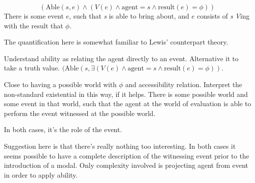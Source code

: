 \begin{note}
  \[(\text{Able}(s,e) \land (V(e) \land \text{agent} = s \land \text{result}(e) = \phi))\]
  There is some event \(e\), such that \emph{s} is able to bring about, and \(e\) consists of \emph{s} \emph{V}ing with the result that \(\phi\).

  The quantification here is somewhat familiar to Lewis' counterpart theory.

  Understand ability as relating the agent directly to an event.
  Alternative it to take a truth value.
  \((\text{Able}(s,\exists (V(e) \land \text{agent} = s \land \text{result}(e) = \phi))\).

  Close to having a possible world with \(\phi\) and accessibility relation.
  Interpret the non-standard existential in this way, if it helps.
  There is some possible world and some event in that world, such that the agent at the world of evaluation is able to perform the event witnessed at the possible world.

  In both cases, it's the role of the event.

  \begin{figure}[h]
    \begin{subfigure}{.5\textwidth}
      \centering
    \end{subfigure}
    \begin{subfigure}{.5\textwidth}
      \centering
    \end{subfigure}
  \end{figure}
  Suggestion here is that there's really nothing too interesting.
  In both cases it seems possible to have a complete description of the witnessing event prior to the introduction of a modal.
  Only complexity involved is projecting agent from event in order to apply ability.
\end{note}


